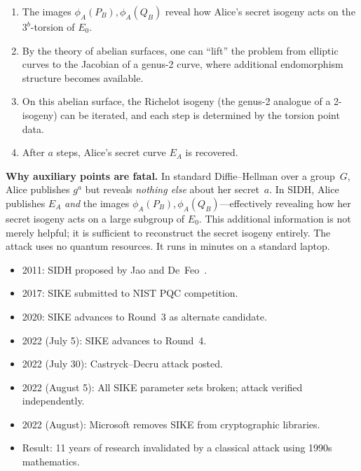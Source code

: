 \begin{enumerate}
\item The images $\phi_A(P_B), \phi_A(Q_B)$ reveal how Alice's secret isogeny acts on the $3^b$-torsion of $E_0$.
\item By the theory of abelian surfaces, one can ``lift'' the problem from elliptic curves to the Jacobian of a genus-2 curve, where additional endomorphism structure becomes available.
\item On this abelian surface, the Richelot isogeny (the genus-2 analogue of a 2-isogeny) can be iterated, and each step is determined by the torsion point data.
\item After $a$ steps, Alice's secret curve $E_A$ is recovered.
\end{enumerate}

\begin{svgraybox}
\textbf{Why auxiliary points are fatal.}  In standard Diffie--Hellman over a group~$G$, Alice publishes $g^a$ but reveals \emph{nothing else} about her secret~$a$.  In SIDH, Alice publishes $E_A$ \emph{and} the images $\phi_A(P_B), \phi_A(Q_B)$---effectively revealing how her secret isogeny acts on a large subgroup of $E_0$.  This additional information is not merely helpful; it is sufficient to reconstruct the secret isogeny entirely.  The attack uses no quantum resources.  It runs in minutes on a standard laptop.
\end{svgraybox}

\begin{example}
\label{ex:sike-timeline}
\begin{itemize}
\item 2011: SIDH proposed by Jao and De~Feo~\cite{JaoDeFeo2011}.
\item 2017: SIKE submitted to NIST PQC competition.
\item 2020: SIKE advances to Round~3 as alternate candidate.
\item 2022 (July 5): SIKE advances to Round~4.
\item 2022 (July 30): Castryck--Decru attack posted.
\item 2022 (August 5): All SIKE parameter sets broken; attack verified independently.
\item 2022 (August): Microsoft removes SIKE from cryptographic libraries.
\item Result: 11 years of research invalidated by a classical attack using 1990s mathematics.
\end{itemize}
\end{example}

